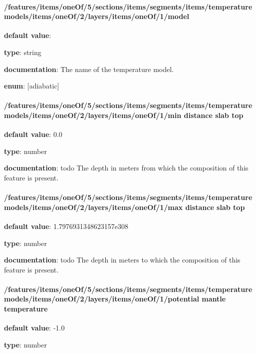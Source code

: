 \paragraph{/features/items/oneOf/5/sections/items/segments/items/temperature models/items/oneOf/2/layers/items/oneOf/1/model} \begin{itemized}
\item {\bf default value}: 
\item {\bf type}: string
\item {\bf documentation}: The name of the temperature model.
\item {\bf enum}: [adiabatic]\end{itemized}\paragraph{/features/items/oneOf/5/sections/items/segments/items/temperature models/items/oneOf/2/layers/items/oneOf/1/min distance slab top} \begin{itemized}
\item {\bf default value}: 0.0
\item {\bf type}: number
\item {\bf documentation}: todo The depth in meters from which the composition of this feature is present.
\end{itemized}\paragraph{/features/items/oneOf/5/sections/items/segments/items/temperature models/items/oneOf/2/layers/items/oneOf/1/max distance slab top} \begin{itemized}
\item {\bf default value}: 1.7976931348623157e308
\item {\bf type}: number
\item {\bf documentation}: todo The depth in meters to which the composition of this feature is present.
\end{itemized}\paragraph{/features/items/oneOf/5/sections/items/segments/items/temperature models/items/oneOf/2/layers/items/oneOf/1/potential mantle temperature} \begin{itemized}
\item {\bf default value}: -1.0
\item {\bf type}: number

\end{itemized}
